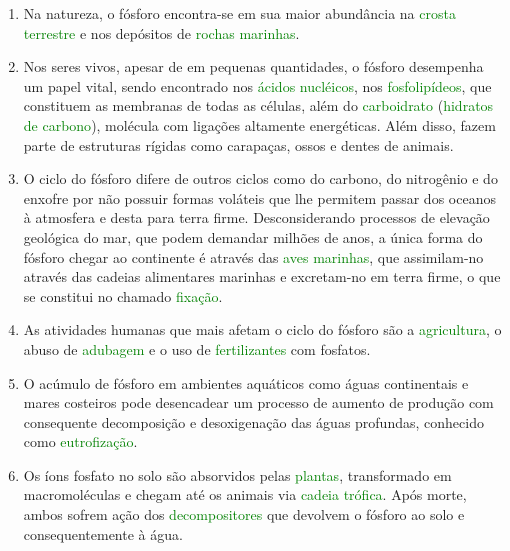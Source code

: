 \documentclass[a4paper,12pt]{article}
\begin{document}
\begin{enumerate}
\item Na natureza, o fósforo encontra-se em sua maior abundância na \textcolor{green}{crosta} \textcolor{green}{terrestre} e nos depósitos de \textcolor{green}{rochas} \textcolor{green}{marinhas}.
\item Nos seres vivos, apesar de em pequenas quantidades, o fósforo desempenha um papel vital, sendo encontrado nos \textcolor{green}{ácidos} \textcolor{green}{nucléicos}, nos \textcolor{green}{fosfolipídeos}, que constituem as membranas de todas as células, além do \textcolor{green}{carboidrato} (\textcolor{green}{hidratos} \textcolor{green}{de carbono}), molécula com ligações altamente energéticas. Além disso, fazem parte de estruturas rígidas como carapaças, ossos e dentes de animais.
\item O ciclo do fósforo difere de outros ciclos como do carbono, do nitrogênio e do enxofre por não possuir formas voláteis que lhe permitem passar dos oceanos à atmosfera e desta para terra firme. Desconsiderando processos de elevação geológica do mar, que podem demandar milhões de anos, a única forma do fósforo chegar ao continente é através das \textcolor{green}{aves} \textcolor{green}{marinhas}, que assimilam-no através das cadeias alimentares marinhas e excretam-no em terra firme, o que se constitui no chamado \textcolor{green}{fixação}.
\item As atividades humanas que mais afetam o ciclo do fósforo são a \textcolor{green}{agricultura}, o abuso de \textcolor{green}{adubagem} e o uso de \textcolor{green}{fertilizantes} com fosfatos.
\item O acúmulo de fósforo em ambientes aquáticos como águas continentais e mares costeiros pode desencadear um processo de aumento de produção com consequente decomposição e desoxigenação das águas profundas, conhecido como \textcolor{green}{eutrofização}.
\item Os íons fosfato no solo são absorvidos pelas \textcolor{green}{plantas}, transformado em macromoléculas e chegam até os animais via \textcolor{green}{cadeia} \textcolor{green}{trófica}. Após morte, ambos sofrem ação dos \textcolor{green}{decompositores} que devolvem o fósforo ao solo e consequentemente à água.
\end{enumerate}
\end{document}
